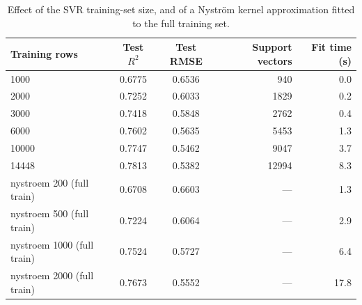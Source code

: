 \begin{table}[htbp]
\centering
\caption{Effect of the SVR training-set size, and of a Nystr\"om kernel approximation fitted to the full training set.}\label{tab:size}
\small
\begin{tabular}{lccrr}
\toprule
Training rows & Test $R^2$ & Test RMSE & Support vectors & Fit time (s) \\
\midrule
1000 & 0.6775 & 0.6536 & 940 & 0.0 \\
2000 & 0.7252 & 0.6033 & 1829 & 0.2 \\
3000 & 0.7418 & 0.5848 & 2762 & 0.4 \\
6000 & 0.7602 & 0.5635 & 5453 & 1.3 \\
10000 & 0.7747 & 0.5462 & 9047 & 3.7 \\
14448 & 0.7813 & 0.5382 & 12994 & 8.3 \\
nystroem 200 (full train) & 0.6708 & 0.6603 & --- & 1.3 \\
nystroem 500 (full train) & 0.7224 & 0.6064 & --- & 2.9 \\
nystroem 1000 (full train) & 0.7524 & 0.5727 & --- & 6.4 \\
nystroem 2000 (full train) & 0.7673 & 0.5552 & --- & 17.8 \\
\bottomrule
\end{tabular}
\end{table}